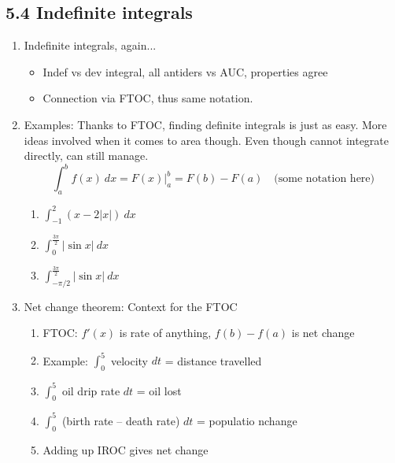 \documentclass{article}
\newcommand{\ds}{\displaystyle}
\begin{document}
\subsection{5.4 Indefinite integrals}
\begin{enumerate}
\item Indefinite integrals, again...
\begin{itemize}
\item Indef vs dev integral, all antiders vs AUC, properties agree
\item Connection via FTOC, thus same notation.
\end{itemize}

\item Examples: Thanks to FTOC, finding definite integrals is just as easy. More ideas involved when it comes to area though. Even though cannot integrate directly, can still manage.
$$
\int_a^b f(x) ~dx  = F(x)\Big|_a^b = F(b)-F(a) \quad \text{(some notation here)}
$$
\begin{enumerate}
\item $\ds \int_{-1}^2 (x-2|x|)~dx$
\item $\int_{0}^\frac{3\pi}{2} |\sin x|~dx$
\item $\int_{-\pi/2}^\frac{3\pi}{2} |\sin x|~dx$
\end{enumerate}


\item Net change theorem: Context for the FTOC
\begin{enumerate}
\item FTOC: $f'(x)$ is rate of anything, $f(b)-f(a)$ is net change
\item Example: $\int_0^5$ velocity $dt$ = distance travelled
\item $\int_0^5$ oil drip rate $dt$ = oil lost
\item $\int_0^5$ (birth rate – death rate) $dt$ = populatio nchange
\item Adding up IROC gives net change
\end{enumerate}
\end{enumerate}


\end{document}
